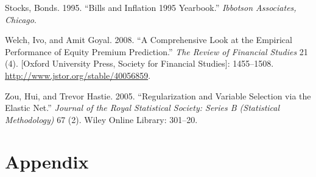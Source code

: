 \documentclass[]{article}
\begin{document}
\leavevmode\hypertarget{ref-stocks1995bills}{}%
Stocks, Bonds. 1995. ``Bills and Inflation 1995 Yearbook.''
\emph{Ibbotson Associates, Chicago}.

\leavevmode\hypertarget{ref-goyalwelch2008}{}%
Welch, Ivo, and Amit Goyal. 2008. ``A Comprehensive Look at the
Empirical Performance of Equity Premium Prediction.'' \emph{The Review
of Financial Studies} 21 (4). {[}Oxford University Press, Society for
Financial Studies{]}: 1455--1508.
\url{http://www.jstor.org/stable/40056859}.

\leavevmode\hypertarget{ref-zou2005regularization}{}%
Zou, Hui, and Trevor Hastie. 2005. ``Regularization and Variable
Selection via the Elastic Net.'' \emph{Journal of the Royal Statistical
Society: Series B (Statistical Methodology)} 67 (2). Wiley Online
Library: 301--20.

\hypertarget{appendix}{%
\section{Appendix}\label{appendix}}
\end{document}
